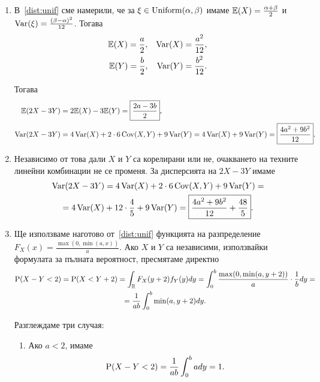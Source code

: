 \documentclass[numbers=endperiod, DIV=15, bibliography=totocnumbered]{scrartcl}
\begin{document}
\begin{solution}
  \mbox{}
  \begin{enumerate}[label=\alph*)]
    \item В~\ref{dist:unif} сме намерили, че за $\xi \in \operatorname{Uniform}(\alpha, \beta)$ имаме $\mathbb{E}(X) = \frac {\alpha + \beta} 2$ и $\operatorname{Var}(\xi) = \frac {{(\beta - \alpha)}^2} {12}$. Тогава
    \begin{align*}
      \mathbb{E}(X) = \frac a 2,
      &&
      \operatorname{Var}(X) = \frac {a^2} {12},
      \\
      \mathbb{E}(Y) = \frac b 2,
      &&
      \operatorname{Var}(Y) = \frac {b^2} {12}.
    \end{align*}

    Тогава
    \begin{align*}
      \mathbb{E}(2X - 3Y)
      &=
      2\mathbb{E}(X) - 3\mathbb{E}(Y)
      =
      \boxed{\frac {2a - 3b} 2},
      \\
      \operatorname{Var}(2X - 3Y)
      &=
      4\operatorname{Var}(X) + 2 \cdot 6 \operatorname{Cov}(X, Y) + 9\operatorname{Var}(Y)
      =
      4\operatorname{Var}(X) + 9\operatorname{Var}(Y)
      =
      \boxed{\frac {4a^2 + 9b^2} {12}}.
    \end{align*}

    \item Независимо от това дали $X$ и $Y$ са корелирани или не, очакването на техните линейни комбинации не се променя. За дисперсията на $2X - 3Y$ имаме
    \begin{multline*}
      \operatorname{Var}(2X - 3Y)
      =
      4\operatorname{Var}(X) + 2 \cdot 6 \operatorname{Cov}(X, Y) + 9\operatorname{Var}(Y)
      = \\ =
      4\operatorname{Var}(X) + 12 \cdot \frac 4 5 + 9\operatorname{Var}(Y)
      =
      \boxed{\frac {4a^2 + 9b^2} {12} + \frac {48} 5}.
    \end{multline*}

    \item Ще използваме наготово от~\ref{dist:unif} функцията на разпределение $F_X(x) = \frac {\max(0, \min(a, x))} a$. Ако $X$ и $Y$ са независими, използвайки формулата за пълната вероятност, пресмятаме директно
    \begin{multline*}
      \operatorname{P}(X - Y < 2)
      =
      \operatorname{P}(X < Y + 2)
      =
      \int_{\mathbb{R}} F_X(y+2) f_Y(y) dy
      =
      \int_0^b \frac {\max(0, \min(a, y+2))} a \cdot \frac 1 b dy
      = \\ =
      \frac 1 {ab} \int_0^b \min(a, y+2) dy.
    \end{multline*}

    Разглеждаме три случая:
    \begin{enumerate}[label=\arabic*)]
      \item Ако $a < 2$, имаме
      \begin{displaymath}
        \operatorname{P}(X - Y < 2)
        =
        \frac 1 {ab} \int_0^b a dy
        =
        1.
      \end{displaymath}


\end{enumerate}
\end{enumerate}
\end{solution}
\end{document}
